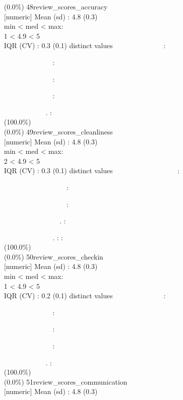 \documentclass[
  journal,
]{IEEEtran}%
\begin{document}
(0.0\%) \textbar{} \textbar{} 48\textbar review\_scores\_accuracy\\
{[}numeric{]} \textbar Mean (sd) : 4.8 (0.3)\\
min \textless{} med \textless{} max:\\
1 \textless{} 4.9 \textless{} 5\\
IQR (CV) : 0.3 (0.1)  distinct values \textbar{}
\textbar~~~~~~~~~~~~~~:\\
\strut ~~~~~~~~~~~~~~:\\
\strut ~~~~~~~~~~~~~~:\\
\strut ~~~~~~~~~~~~~~:\\
\strut ~~~~~~~~~~~~. : \\
(100.0\%) \\
(0.0\%) \textbar{} \textbar{} 49\textbar review\_scores\_cleanliness\\
{[}numeric{]} \textbar Mean (sd) : 4.8 (0.3)\\
min \textless{} med \textless{} max:\\
2 \textless{} 4.9 \textless{} 5\\
IQR (CV) : 0.3 (0.1)  distinct values \textbar{}
\textbar~~~~~~~~~~~~~~~~~~:\\
\strut ~~~~~~~~~~~~~~~~~~:\\
\strut ~~~~~~~~~~~~~~~~~~:\\
\strut ~~~~~~~~~~~~~~~~. :\\
\strut ~~~~~~~~~~~~~~. : : \\
(100.0\%) \\
(0.0\%) \textbar{} \textbar{} 50\textbar review\_scores\_checkin\\
{[}numeric{]} \textbar Mean (sd) : 4.8 (0.3)\\
min \textless{} med \textless{} max:\\
1 \textless{} 4.9 \textless{} 5\\
IQR (CV) : 0.2 (0.1)  distinct values \textbar{}
\textbar~~~~~~~~~~~~~~:\\
\strut ~~~~~~~~~~~~~~:\\
\strut ~~~~~~~~~~~~~~:\\
\strut ~~~~~~~~~~~~~~:\\
\strut ~~~~~~~~~~~~. : \\
(100.0\%) \\
(0.0\%) \textbar{} \textbar{} 51\textbar review\_scores\_communication\\
{[}numeric{]} \textbar Mean (sd) : 4.8 (0.3)\\
\end{document}
